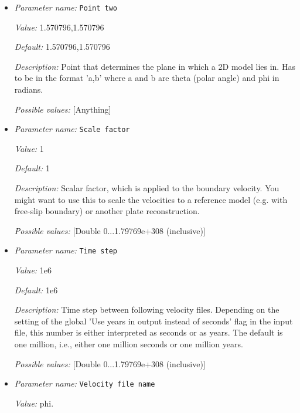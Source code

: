 \begin{itemize}
{\it Possible values:} [Anything]
\item {\it Parameter name:} {\tt Point two}
\label{parameters:Boundary velocity model/GPlates model/Point two}


{\it Value:} 1.570796,1.570796


{\it Default:} 1.570796,1.570796


{\it Description:} Point that determines the plane in which a 2D model lies in. Has to be in the format 'a,b' where a and b are theta (polar angle)  and phi in radians.


{\it Possible values:} [Anything]
\item {\it Parameter name:} {\tt Scale factor}
\label{parameters:Boundary velocity model/GPlates model/Scale factor}


{\it Value:} 1


{\it Default:} 1


{\it Description:} Scalar factor, which is applied to the boundary velocity. You might want to use this to scale the velocities to a reference model (e.g. with free-slip boundary) or another plate reconstruction.


{\it Possible values:} [Double 0...1.79769e+308 (inclusive)]
\item {\it Parameter name:} {\tt Time step}
\label{parameters:Boundary velocity model/GPlates model/Time step}


{\it Value:} 1e6


{\it Default:} 1e6


{\it Description:} Time step between following velocity files. Depending on the setting of the global 'Use years in output instead of seconds' flag in the input file, this number is either interpreted as seconds or as years. The default is one million, i.e., either one million seconds or one million years.


{\it Possible values:} [Double 0...1.79769e+308 (inclusive)]
\item {\it Parameter name:} {\tt Velocity file name}
\label{parameters:Boundary velocity model/GPlates model/Velocity file name}


{\it Value:} phi.%



\end{itemize}
